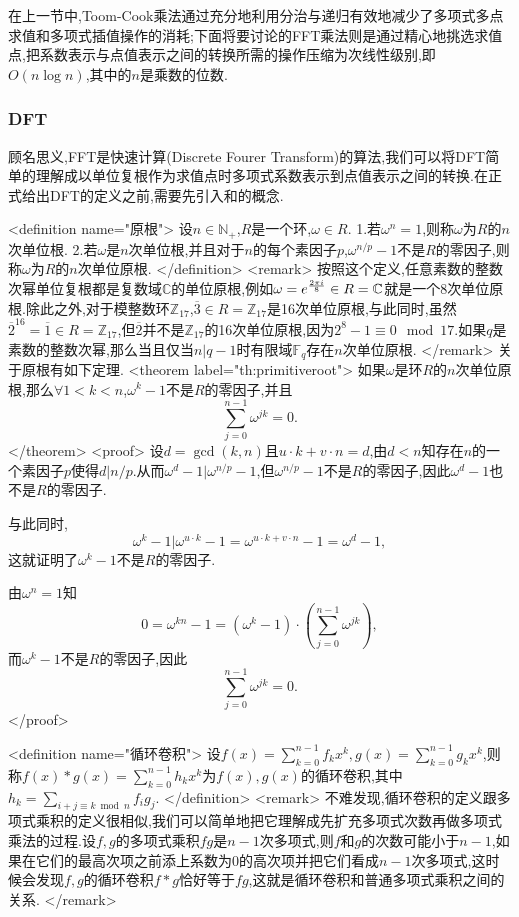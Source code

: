 \documentclass{ctexart}
\begin{document}
在上一节中,Toom-Cook乘法通过充分地利用分治与递归有效地减少了多项式多点求值和多项式插值操作的消耗;下面将要讨论的FFT乘法则是通过精心地挑选求值点,把系数表示与点值表示之间的转换所需的操作压缩为次线性级别,即$O(n\log{n})$,其中的$n$是乘数的位数.

\subsubsection{DFT}

顾名思义,FFT是快速计算(Discrete Fourer Transform)的算法,我们可以将DFT简单的理解成以单位复根作为求值点时多项式系数表示到点值表示之间的转换.在正式给出DFT的定义之前,需要先引入和的概念.

<definition  name="原根">
设$n\in\mathbb{N}_+$,$R$是一个环,$\omega\in R$.
 1.若$\omega^n=1$,则称$\omega$为$R$的$n$次单位根.
 2.若$\omega$是$n$次单位根,并且对于$n$的每个素因子$p$,$\omega^{n/p}-1$不是$R$的零因子,则称$\omega$为$R$的$n$次单位原根.
</definition>
<remark>
按照这个定义,任意素数的整数次幂单位复根都是复数域$\mathbb{C}$的单位原根,例如$\omega=e^{{2\pi i\over 8}}\in R=\mathbb{C}$就是一个8次单位原根.除此之外,对于模整数环$\mathbb{Z}_{17}$,$\overline{3}\in R=\mathbb{Z}_{17}$是16次单位原根,与此同时,虽然$\overline{2}^{16}=\overline{1}\in R=\mathbb{Z}_{17}$,但$\overline{2}$并不是$\mathbb{Z}_{17}$的16次单位原根,因为$2^8-1\equiv 0\mod 17$.如果$q$是素数的整数次幂,那么当且仅当$n|q-1$时有限域$\mathbb{F}_q$存在$n$次单位原根.
</remark>
关于原根有如下定理.
<theorem label="th:primitiveroot">
如果$\omega$是环$R$的$n$次单位原根,那么$\forall 1<k<n$,$\omega^k-1$不是$R$的零因子,并且$$\sum_{j=0}^{n-1}\omega^{jk}=0.$$
</theorem>
<proof>
设$d=\gcd(k,n)$且$u\cdot k+v\cdot n=d$,由$d<n$知存在$n$的一个素因子$p$使得$d|n/p$.从而$\omega^d-1|\omega^{n/p}-1$,但$\omega^{n/p}-1$不是$R$的零因子,因此$\omega^d-1$也不是$R$的零因子.

与此同时,$$\omega^k-1|\omega^{u\cdot k}-1=\omega^{u\cdot k+v\cdot n}-1=\omega^d-1,$$这就证明了$\omega^k-1$不是$R$的零因子.

由$\omega^n=1$知$$0=\omega^{kn}-1=(\omega^k-1)\cdot(\sum_{j=0}^{n-1}\omega^{jk}),$$而$\omega^k-1$不是$R$的零因子,因此$$\sum_{j=0}^{n-1}\omega^{jk}=0.$$
</proof>

<definition  name="循环卷积">
设$f(x)=\sum\limits_{k=0}^{n-1}f_kx^k,g(x)=\sum\limits_{k=0}^{n-1}g_kx^k$,则称$f(x)*g(x)=\sum\limits_{k=0}^{n-1}h_kx^k$为$f(x),g(x)$的循环卷积,其中$h_k=\sum\limits_{i+j\equiv k\bmod n}f_ig_j$.
</definition>
<remark>
不难发现,循环卷积的定义跟多项式乘积的定义很相似,我们可以简单地把它理解成先扩充多项式次数再做多项式乘法的过程.设$f,g$的多项式乘积$fg$是$n-1$次多项式,则$f$和$g$的次数可能小于$n-1$,如果在它们的最高次项之前添上系数为0的高次项并把它们看成$n-1$次多项式,这时候会发现$f,g$的循环卷积$f*g$恰好等于$fg$,这就是循环卷积和普通多项式乘积之间的关系.
</remark>
\end{document}
